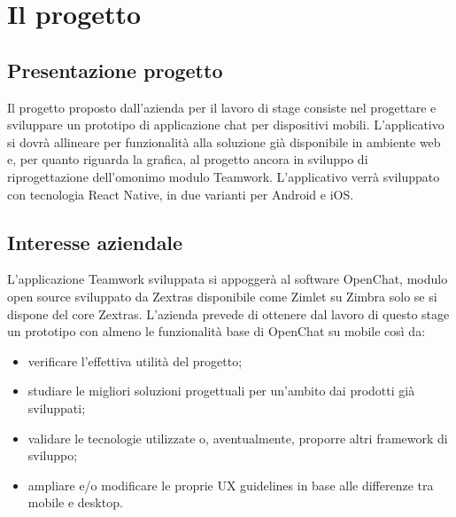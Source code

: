 
\chapter{Il progetto}\label{chap:project}

\section{Presentazione progetto}
Il progetto proposto dall'azienda per il lavoro di stage consiste nel progettare e sviluppare un prototipo di applicazione chat per dispositivi mobili. L'applicativo si dovrà allineare per funzionalità alla soluzione già disponibile in ambiente web e, per quanto riguarda la grafica, al progetto ancora in sviluppo di riprogettazione dell'omonimo modulo Teamwork.
L’applicativo verrà sviluppato con tecnologia React Native, in due varianti per Android e iOS.

\section{Interesse aziendale}
L'applicazione Teamwork sviluppata si appoggerà al software OpenChat, modulo open source  sviluppato da Zextras disponibile come Zimlet su Zimbra solo se si dispone del core Zextras.
L'azienda prevede di ottenere dal lavoro di questo stage un prototipo con almeno le funzionalità base di OpenChat su mobile così da:
\begin{itemize}
	\item verificare l'effettiva utilità del progetto;
	\item studiare le migliori soluzioni progettuali per un'ambito  dai prodotti già sviluppati;
	\item validare le tecnologie utilizzate o, aventualmente, proporre altri framework di sviluppo;
	\item ampliare e/o modificare le proprie UX guidelines in base alle differenze tra mobile e desktop.
\end{itemize}


